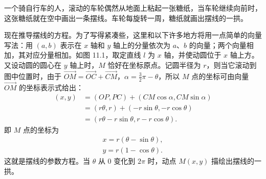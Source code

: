 一个骑自行车的人，滚动的车轮偶然从地面上粘起一张糖纸，当车轮继续向前时，这张糖纸就在空中画出一条摆线。车轮每旋转一周，糖纸就画出摆线的一拱。

现在推导摆线的方程。为了写得紧凑些，这里和以下许多地方将用一点简单的向量写法：用 $(a, b)$ 表示在 $x$ 轴和 $y$ 轴上的分量依次为 $a$、$b$ 的向量；两个向量相加，其对应分量相加。如图 11.1，取定直线 $l$ 为 $x$ 轴，并使动圆位于 $x$ 轴上方。又设动圆的圆心在 $y$ 轴上时，$M$ 恰好在坐标原点。记圆半径为 $r$，则当它滚动到图中位置时，由于 $\overrightarrow{OM} = \overrightarrow{OC} + \overrightarrow{CM}$，$\alpha = \frac{3}{2}\pi - \theta$，所以 $M$ 点的坐标可由向量 $\overrightarrow{OM}$ 的坐标表示式给出：
\begin{align*}
  (x, y) &= (OP, PC) + (CM\cos\alpha, CM\sin\alpha) \\
         &= (r\theta, r) + (-r\sin\theta, -r\cos\theta) \\
         &= (r\theta - r\sin\theta, r - r\cos\theta).
\end{align*}
即 $M$ 点的坐标为
\begin{gather*}
  x = r(\theta - \sin\theta), \\
  y = r(1 - \cos\theta).
\end{gather*}
这就是摆线的参数方程。当 $\theta$ 从 $0$ 变化到 $2\pi$ 时，动点 $M(x, y)$ 描绘出摆线的一拱。
